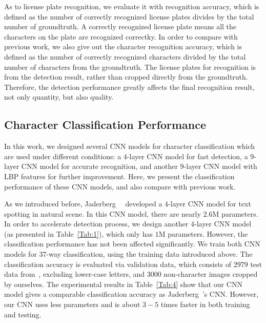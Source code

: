 \documentclass[twocolumn]{svjour3}
\begin{document}
As to license plate recognition, we evaluate it with recognition accuracy, which is defined as the number of correctly recognized license plates divides by the total number of groundtruth. A correctly recognized license plate means all the characters on the plate are recognized correctky. In order to compare with previous work, we also give out the character recognition accuracy, which is defined as the number of correctly recognized characters divided by the total number of characters from the groundtruth. The license plates for recognition is from the detection result, rather than cropped directly from the groundtruth. Therefore, the detection performance greatly affects the final recognition result, not only quantity, but also quality.

\subsection{Character Classification Performance}
In this work, we designed several CNN models for character classification which are used under different conditions: a $4$-layer CNN model for fast detection, a $9$-layer CNN model for accurate recognition, and another $9$-layer CNN model with LBP features for further improvement. Here, we present the classification performance of these CNN models, and also compare with previous work.

As we introduced before, Jaderberg~\etal~\cite{Max2014ECCV} developed a $4$-layer CNN model for text spotting in natural scene. In this CNN model, there are nearly $2.6$M parameters. In order to accelerate detection process, we design another $4$-layer CNN model (as presented in Table~\ref{Tab:1}), which only has $1$M parameters. However, the classification performance has not been affected significantly. We train both CNN models for $37$-way classification, using the training data introduced above. The classification accuracy is evaluated via validation data, which consists of $2979$ test data from~\cite{Max2014ECCV}, excluding lower-case letters, and $3000$ non-character images cropped by ourselves. The experimental results in Table~\ref{Tab:4} show that our CNN model gives a comparable classification accuracy as Jaderberg~\etal's CNN. However, our CNN uses less parameters and is about $3-5$ times faster in both training and testing.
\end{document}
